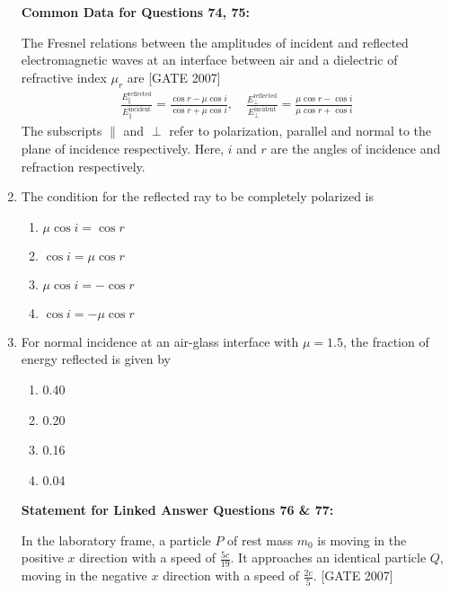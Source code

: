 \documentclass[journal,12pt,onecolumn]{IEEEtran}
\theoremstyle{remark}
\begin{document}
\begin{enumerate}
\textbf{Common Data for Questions 74, 75:}

The Fresnel relations between the amplitudes of incident and reflected electromagnetic waves at an interface between air and a dielectric of refractive index $\mu_r$ are   \hfill{[GATE 2007]}
\begin{align*}
    \frac{E_{\parallel}^{\text{reflected}}}{E_{\parallel}^{\text{incident}}} = \frac{\cos r - \mu \cos i}{\cos r + \mu \cos i}, \quad \frac{E_{\perp}^{\text{reflected}}}{E_{\perp}^{\text{incident}}} = \frac{\mu \cos r - \cos i}{\mu \cos r + \cos i}
\end{align*}
The subscripts $\parallel$ and $\perp$ refer to polarization, parallel and normal to the plane of incidence respectively. Here, $i$ and $r$ are the angles of incidence and refraction respectively.


    \item  The condition for the reflected ray to be completely polarized is
    \begin{multicols}{2}
    \begin{enumerate}
        \item $\mu \cos i = \cos r$
        \item $\cos i = \mu \cos r$
        \item $\mu \cos i = - \cos r$
        \item $\cos i = - \mu \cos r$
    \end{enumerate}
    \end{multicols}

    \item  For normal incidence at an air-glass interface with $\mu = 1.5$, the fraction of energy reflected is given by
    \begin{multicols}{4}
    \begin{enumerate}
        \item 0.40
        \item 0.20
        \item 0.16
        \item 0.04
    \end{enumerate}
    \end{multicols}



\textbf{Statement for Linked Answer Questions 76 \& 77:}

In the laboratory frame, a particle $P$ of rest mass $m_0$ is moving in the positive $x$ direction with a speed of $\frac{5c}{19}$. It approaches an identical particle $Q$, moving in the negative $x$ direction with a speed of $\frac{2c}{5}$.  \hfill{[GATE 2007]}


\end{enumerate}
\end{document}
